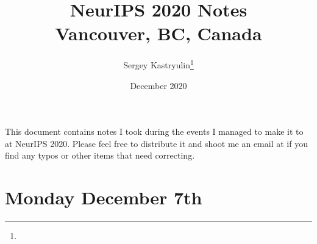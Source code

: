 \documentclass[11pt]{article}
\title{NeurIPS 2020 Notes \\ \Large{Vancouver, BC, Canada}}
\author{Sergey Kastryulin\footnote{\durl{https://github.com/snk4tr}} \\ \durl{snk4tr@gmail.com}}
\date{December 2020}
\begin{document}
\maketitle
\tableofcontents
\newpage


This document contains notes I took during the events I managed to make it to at NeurIPS 2020. Please feel free to distribute it and shoot me an email at  if you find any typos or other items that need correcting. \\




\newpage
\section{Monday December 7th}



\newpage


\end{document}
